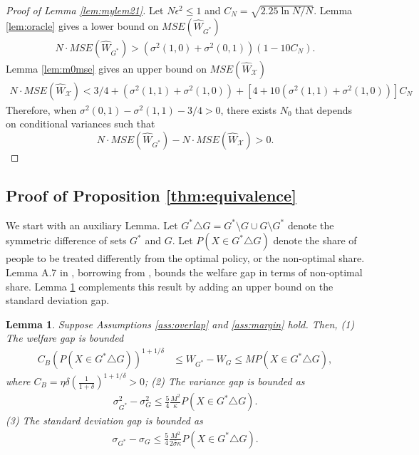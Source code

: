 \documentclass[12pt]{article}
\numberwithin{equation}{section}
\theoremstyle{plain}                         %
\newtheorem{lemma}{Lemma}
\theoremstyle{definition}                  %
\theoremstyle{remark}                      %
\begin{document}
\begin{proof}[Proof of Lemma \ref{lem:mylem21}]
Let $N \epsilon^2 \leq 1$ and $C_N = \sqrt{2.25 \ln N /N}$. Lemma \ref{lem:oracle} gives a lower bound on $MSE (\widehat W_{G^{*}})$
\begin{align*}
N \cdot MSE (\widehat W_{G^{*}}) >  (\sigma^2(1,0) + \sigma^2(0,1)) (1- 10C_N). 
\end{align*}
Lemma \ref{lem:m0mse} gives an upper bound on $MSE(\widehat{W}_{\mathcal{X}})$
\begin{align}
N \cdot MSE(\widehat{W}_{\mathcal{X}}) < 3/4+(\sigma^2(1,1)+\sigma^2(1,0))+[4+10(\sigma^2(1,1)+\sigma^2(1,0))]C_N
\end{align}
 Therefore, when $\sigma^2(0,1)-\sigma^2(1,1)-3/4>0$, there exists $N_0$ that depends on conditional variances such that 
 $$
N \cdot MSE (\widehat W_{G^{*}}) - N \cdot MSE(\widehat{W}_{\mathcal{X}})> 0.
$$
\end{proof}




\subsection{Proof of Proposition \ref{thm:equivalence}}
\label{sec:sec2}

We start with an auxiliary Lemma. Let $G^{*}  \triangle  G = G^{*} \setminus G \cup G \setminus G^{*}$ denote the symmetric difference of sets $G^{*}$ and $G$.  Let $ P(X \in G^{*}  \triangle  G)$ denote the share of people to be treated differently from the optimal policy, or the non-optimal share. Lemma A.7 in \citet{KitagawaTetenovSupp}, borrowing from \citet{Tsybakov}, bounds the welfare gap in terms of non-optimal share.  Lemma \ref{lem:tsybakov} complements this result by adding an upper bound on the standard deviation gap. 

\begin{lemma}
\label{lem:tsybakov}
 Suppose Assumptions \ref{ass:overlap} and \ref{ass:margin} hold.  Then, 
 (1) The welfare gap is bounded 
\begin{align}
C_B(P (X \in G^{*}  \triangle  G))^{1+1/\delta} &\leq W_{G^{*}} -W_G \leq M P (X \in G^{*}  \triangle  G), \label{eq:tsybakov}
\end{align}
where $C_B=\eta \delta(\frac{1}{1+\delta})^{1+1/\delta}>0$; \newline
(2) The variance gap is bounded as
\begin{align}
\label{eq:varineq}
\sigma^2_{G^{*}} - \sigma^2_G \leq \frac{5}{4}\frac{M^2}{\kappa} P (X \in G^{*}  \triangle  G).
\end{align}
(3) The standard deviation gap is bounded as
\begin{align}
\label{eq:varineq2}
\sigma_{G^{*}} - \sigma_G \leq \frac{5}{4} \frac{M^2}{2\bar{\sigma} \kappa} P (X \in G^{*}  \triangle  G).
\end{align}
\end{lemma}
\end{document}

